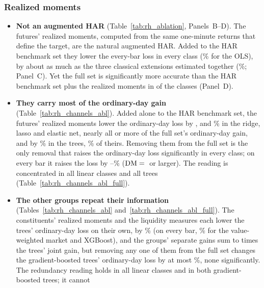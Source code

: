 \subsubsection{Realized moments}
\label{sec:rh_fi_ordinary}
\label{sec:rh_results_bench}
\begin{itemize}
\item \textbf{Not an augmented HAR} (Table~\ref{tab:rh_ablation}, Panels~B--D). The futures' realized moments,
  computed from the same one-minute returns that define the target, are the natural augmented HAR. Added to the HAR
  benchmark set they lower the every-bar loss in every class (\rhabOlsAddRmAllPct\% for the OLS), by about as much as
  the three classical extensions estimated together (\rhabOlsSharqlAllPct\%; Panel~C). Yet the full set is
  significantly more accurate than the HAR benchmark set plus the realized moments in \rhabNClassesBeatAddRm{} of the
  \rhabNClassesAddRm{} classes (Panel~D).
\item \textbf{They carry most of the ordinary-day gain} (Table~\ref{tab:rh_channels_abl}). Added alone to the HAR
  benchmark set, the futures' realized moments lower the ordinary-day loss by \rhchRidgeOrdAddRmPct,
  \rhchLassoOrdAddRmPct{} and \rhchEnetOrdAddRmPct\% in the ridge, lasso and elastic net, nearly all or more of the
  full set's ordinary-day gain, and by \rhchOrdAddRmTreeRng\% in the trees, \rhchOrdRmShareTreeRng\% of theirs. Removing
  them from the full set is the only removal that raises the ordinary-day loss significantly in every class; on every
  bar it raises the loss by \rhabLoRmAllPctMin--\rhabLoRmAllPctMax\% ($\mathrm{DM}={}$\rhabLoRmAllDmMin{} or larger). The
  reading is concentrated in all \rhchLinOrdNConcTest{} linear classes and all \rhchTreeOrdNConcTest{} trees
  (Table~\ref{tab:rh_channels_abl_full}).
\item \textbf{The other groups repeat their information} (Tables~\ref{tab:rh_channels_abl}
  and~\ref{tab:rh_channels_abl_full}). The constituents' realized moments and the liquidity
  measures each lower the trees' ordinary-day loss on their own, by \rhchOrdAddOtherTreeRng\% (on every bar,
  \rhabXgbAddVwAllPct\% for the value-weighted market and XGBoost), and the groups' separate gains sum to
  \rhchOrdSumRatioTreeRng{} times the trees' joint gain, but removing any one of them from the full set changes the
  gradient-boosted trees' ordinary-day loss by at most \rhchOrdLoOtherTreeMaxAbs\%, none significantly. The
  redundancy reading holds in all \rhchLinOrdNRedTest{} linear classes and in both gradient-boosted trees; it cannot

\end{itemize}
